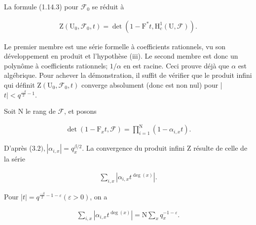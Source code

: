 \documentclass[10pt,leqno]{article}
\begin{document}
\noindent La formule (1.14.3) pour \(\mathcal{F} _{0}\) se réduit à\par

\begin{equation*}\begin{gathered}\mathrm{Z}(\mathrm{U}_{0},\mathcal{F} _{0},t) = \operatorname{det}(1- \mathrm{F}^{*}t,\mathrm{H}_{c}^{1}(\mathrm{U},\mathcal{F} )).\end{gathered}\end{equation*}

\noindent Le premier membre est une série formelle à coefficients rationnels, vu son développement en produit et l’hypothèse (iii). Le second membre est donc un polynôme à coefficients rationnels; \(1/\alpha \) en est racine. Ceci prouve déjà que \(\alpha \) est algébrique. Pour achever la démonstration, il suffit de vérifier que le produit infini qui définit \(\mathrm{Z}(\mathrm{U}_{0},\mathcal{F} _{0},t)\) converge absolument (donc est non nul) pour |\(t|<q^{\frac{-\beta}{2}- 1}\).\par

\noindent Soit \(\mathrm{N}\) le rang de \(\mathcal{F} \), et posons\par

\begin{equation*}\begin{gathered}\operatorname{det}(1- \mathrm{F}_{x} t,\mathcal{F} ) = \prod _{i=1}^{\mathrm{N}} (1- \alpha _{i,x}t).\end{gathered}\end{equation*}

\noindent D’après (\(3.2), |\alpha _{i,x}|=q_{x}^{\beta /2}\). La convergence du produit infini \(\mathrm{Z}\) résulte de celle de la série\par

\begin{equation*}\begin{gathered}\sum _{i,x} |\alpha _{i,x}t^{\operatorname{deg}(x)}|.\end{gathered}\end{equation*}

\noindent Pour |\(t|=q^{\frac{-\beta}{2}- 1- \varepsilon } (\varepsilon >0)\), on a\par

\begin{equation*}\begin{gathered}\sum _{i,x} |\alpha _{i,x}t^{\operatorname{deg}(x)}| = \mathrm{N}\sum _{x} q_{x}^{- 1- \varepsilon }.\end{gathered}\end{equation*}
\end{document}
